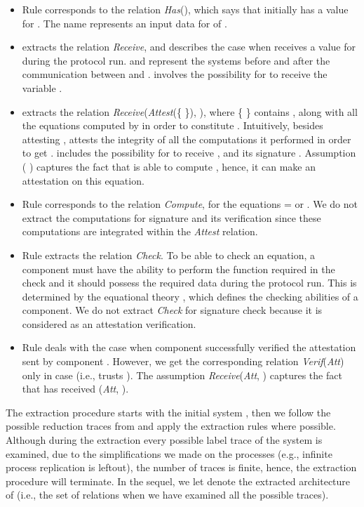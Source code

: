 \documentclass{llncs}
\begin{document}
\begin{itemize}
\item 
Rule  corresponds to the relation \textit{Has}(), which 
says that  initially has a value for . The name  represents an input data for  of .

\item 
 extracts the relation \textit{Receive}, and describes the case when   
receives a value  for  during the protocol run.  and  represent the systems before and after 
the communication between  and .  involves the possibility for  to receive 
the variable . 
 
\item 
 extracts the relation \textit{Receive}(\textit{Attest}(\{  \}), ), where \{  \} contains   , along with all the equations 
   computed by  in order to constitute . Intuitively, besides attesting   ,  attests the integrity of all the computations it performed in order to get .  includes the possibility for  to receive , and its signature . Assumption (  )   captures the fact that  is able to compute 
  , hence, it can make an attestation on this equation. 
   
\item 
Rule  corresponds to the relation \textit{Compute}, 
for the equations  =  or   . We do not extract the 
computations for signature and its verification since these computations are integrated within 
the \textit{Attest} relation. 

\item 
Rule  extracts the relation \textit{Check}. To be able to check an equation, a component 
must have the ability to perform the function required in the check and it should possess the 
required data during the protocol run. This is determined by the equational theory , which defines 
the checking abilities of a component. We do not extract \textit{Check} for signature 
check because it is considered as an attestation verification.

\item 
Rule  deals with the case when component  successfully verified the 
attestation sent by component . However, we get the corresponding relation 
\textit{Verif}(\textit{Att}) only in case    
(i.e.,  trusts ). The assumption \textit{Receive}(\textit{Att}, )  
 captures the fact that  has received (\textit{Att}, ).    
\end{itemize}

The extraction procedure starts with the initial system , then we follow the possible reduction traces from  and apply the extraction rules where possible. 
Although during the extraction
every possible label trace of the system is examined, due to the simplifications we made on the 
processes (e.g., infinite process replication is leftout), the number of traces is finite, 
hence, the extraction procedure will terminate. In the sequel, we let  denote 
the extracted architecture of  (i.e., the set of relations  when we have examined all the 
possible traces).  
\end{document}
